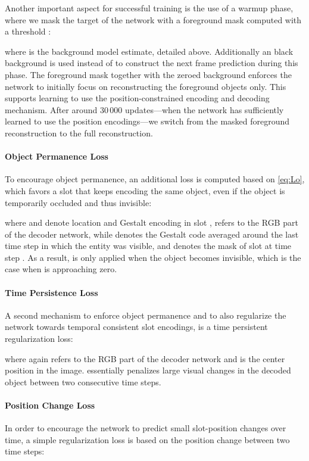 \documentclass{article} \usepackage{iclr2023_conference_arxiv,times}
\begin{document}
Another important aspect for successful training is the use of a warmup phase, where we mask the target of the network with a foreground mask computed with a threshold : 

where  is the background model estimate, detailed above. Additionally an black background is used instead of  to construct the next frame prediction during this phase.
The foreground mask together with the zeroed background enforces the network to initially focus on reconstructing the foreground objects only. This supports learning to use the position-constrained encoding and decoding mechanism. After around 30\,000 updates---when the network has sufficiently learned to use the position encodings---we switch from the masked foreground reconstruction to the full reconstruction.
    
    
\paragraph{Object Permanence Loss}
To encourage object permanence, an additional loss is computed based on \autoref{eq:Lo}, which favors a slot that keeps encoding the same object, even if the object is temporarily occluded and thus invisible:

where  and  denote location and Gestalt encoding in slot ,  refers to the RGB part of the decoder network, while  denotes the Gestalt code averaged around the last time step in which the entity was visible, and  denotes the mask of slot  at time step . 
As a result,  is only applied when the object becomes invisible, which is the case when  is approaching zero. 
 
\paragraph{Time Persistence Loss}
A second mechanism to enforce object permanence and to also regularize the network towards temporal consistent slot encodings, is a time persistent regularization loss: 

where again  refers to the RGB part of the decoder network and  is the center position in the image.  essentially penalizes large visual changes in the decoded object between two consecutive time steps.

\paragraph{Position Change Loss}
In order to encourage the network to predict small slot-position changes over time, a simple  regularization loss is based on the position change between two time steps:
\end{document}
